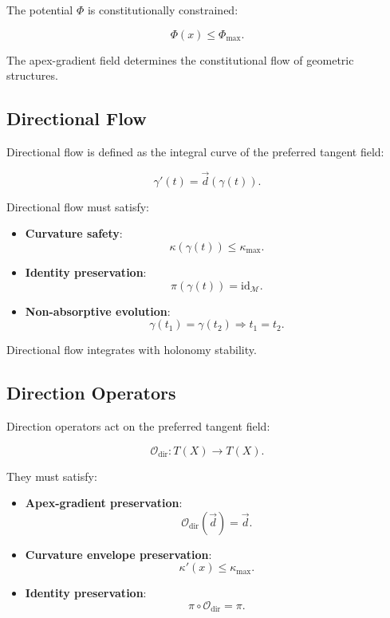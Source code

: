 The potential $\Phi$ is constitutionally constrained:

\[
\Phi(x) \le \Phi_{\max}.
\]

The apex-gradient field determines the constitutional flow of geometric
structures.


\subsection{Directional Flow}

Directional flow is defined as the integral curve of the preferred tangent
field:

\[
\gamma'(t) = \vec{d}(\gamma(t)).
\]

Directional flow must satisfy:

\begin{itemize}
    \item \textbf{Curvature safety}:
    \[
    \kappa(\gamma(t)) \le \kappa_{\max}.
    \]

    \item \textbf{Identity preservation}:
    \[
    \pi(\gamma(t)) = \mathrm{id}_{\mathcal{M}}.
    \]

    \item \textbf{Non-absorptive evolution}:
    \[
    \gamma(t_1) = \gamma(t_2) \Rightarrow t_1 = t_2.
    \]
\end{itemize}

Directional flow integrates with holonomy stability.


\subsection{Direction Operators}

Direction operators act on the preferred tangent field:

\[
\mathcal{O}_{\mathrm{dir}} :
T(X) \to T(X).
\]

They must satisfy:

\begin{itemize}
    \item \textbf{Apex-gradient preservation}:
    \[
    \mathcal{O}_{\mathrm{dir}}(\vec{d}) = \vec{d}.
    \]

    \item \textbf{Curvature envelope preservation}:
    \[
    \kappa'(x) \le \kappa_{\max}.
    \]

    \item \textbf{Identity preservation}:
    \[
    \pi \circ \mathcal{O}_{\mathrm{dir}} = \pi.
    \]
\end{itemize}

